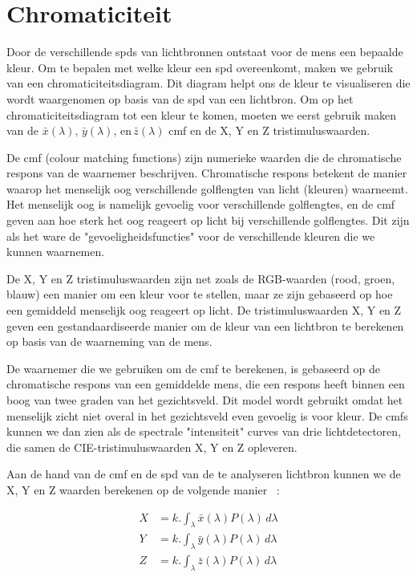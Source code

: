 \section{Chromaticiteit}\label{sec:chromaticiteit}

Door de verschillende \gls{spd}s van lichtbronnen ontstaat voor de mens een bepaalde kleur. Om te bepalen met welke kleur een \gls{spd} overeenkomt, maken we gebruik van een chromaticiteitsdiagram. Dit diagram helpt ons de kleur te visualiseren die wordt waargenomen op basis van de \gls{spd} van een lichtbron. Om op het chromaticiteitsdiagram tot een kleur te komen, moeten we eerst gebruik maken van de $\bar{x}(\lambda), \, \bar{y}(\lambda), \, \text{en} \, \bar{z}(\lambda)$ \gls{cmf} en de X, Y en Z tristimuluswaarden.

De \gls{cmf} (colour matching functions) zijn numerieke waarden die de chromatische respons van de waarnemer beschrijven. Chromatische respons betekent de manier waarop het menselijk oog verschillende golflengten van licht (kleuren) waarneemt. Het menselijk oog is namelijk gevoelig voor verschillende golflengtes, en de \gls{cmf} geven aan hoe sterk het oog reageert op licht bij verschillende golflengtes. Dit zijn als het ware de "gevoeligheidsfuncties" voor de verschillende kleuren die we kunnen waarnemen.

De X, Y en Z tristimuluswaarden zijn net zoals de RGB-waarden (rood, groen, blauw) een manier om een kleur voor te stellen, maar ze zijn gebaseerd op hoe een gemiddeld menselijk oog reageert op licht. De tristimuluswaarden X, Y en Z geven een gestandaardiseerde manier om de kleur van een lichtbron te berekenen op basis van de waarneming van de mens.

De waarnemer die we gebruiken om de \gls{cmf} te berekenen, is gebaseerd op de chromatische respons van een gemiddelde mens, die een respons heeft binnen een boog van twee graden van het gezichtsveld. Dit model wordt gebruikt omdat het menselijk zicht niet overal in het gezichtsveld even gevoelig is voor kleur. De \gls{cmf}s kunnen we dan zien als de spectrale "intensiteit" curves van drie lichtdetectoren, die samen de CIE-tristimuluswaarden X, Y en Z opleveren.

Aan de hand van de \gls{cmf} en de \gls{spd} van de te analyseren lichtbron kunnen we de X, Y en Z waarden berekenen op de volgende manier ~\cite{LightingTechnologyHandbook, CIE1931ColorSpace2024}:

\begin{align*}
X &= k.\int_{\lambda} \bar{x}(\lambda) P(\lambda) \, d\lambda \\
Y &= k.\int_{\lambda} \bar{y}(\lambda) P(\lambda) \, d\lambda \\
Z &= k.\int_{\lambda} \bar{z}(\lambda) P(\lambda) \, d\lambda
\end{align*}


